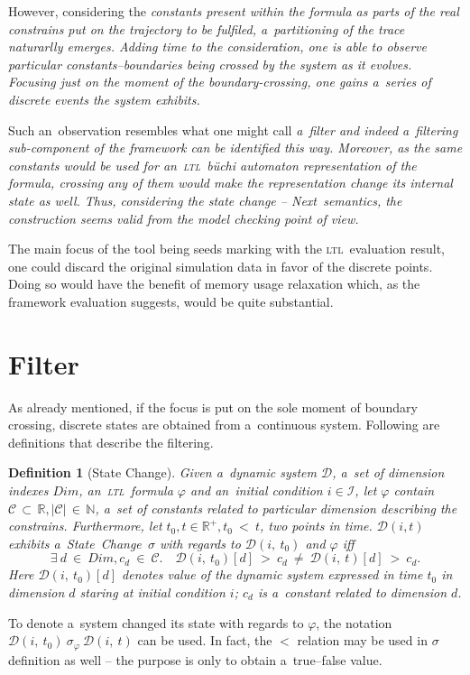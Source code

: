 \documentclass[11pt]{fithesis}
\newcommand{\ltl}{\textsc{ltl}~}
\newcommand{\Next}{\emph{Next}~}
\newcommand{\mD}{\mathcal{D}}
\newcommand{\mC}{\mathcal{C}}
\newcommand{\mI}{\mathcal{I}}
\newcommand{\mReal}{\mathbb{R}}
\newcommand{\mNatural}{\mathbb{N}}
\newtheorem{mydef}{Definition}
\begin{document}
However, considering the \em constants \rm present within the formula as parts of the real \em constrains \rm put on the 
trajectory to be fulfiled, a~partitioning of the trace naturarlly emerges. Adding time to the consideration, one is able to
observe particular constants--boundaries being crossed by the system as it evolves. \em Focusing just on the moment of
the boundary-crossing, one gains a~series of discrete events the system exhibits\rm{}.

Such an~observation resembles what one might call \em a~filter \rm and indeed a~filtering sub-component of the framework
can be identified this way. Moreover, as the same constants would be used for an~\ltl b\"{u}chi automaton representation of the formula, 
crossing any of them would make the representation change its internal state as well.
Thus, considering the state change -- \Next semantics, the construction seems valid from the model checking point of view.

The main focus of the tool being seeds marking with the \ltl evaluation result, one could discard the original simulation
data in favor of the discrete points.
Doing so would have the benefit of memory usage relaxation which, as the framework evaluation suggests, would be quite substantial.

\section{Filter}
As already mentioned, if the focus is put on the sole moment of boundary
crossing, discrete states are obtained from a~continuous system.
Following are definitions that describe the filtering.
\begin{mydef}[State Change]
Given a~dynamic system $\mD$, a~set of dimension indexes $Dim$, an~\ltl formula $\varphi$ and an~initial
condition $i \in \mI$, let $\varphi$ contain
$\mC\,\subset\,\mReal, |\mC|\,\in\,\mNatural$, a~set of constants related to
particular dimension describing the constrains. Furthermore, let
$t_0, t \in \mReal^{+}, t_0~<~t$, two points in time.
$\mD(i, t)$ exhibits a~State~Change~$\sigma$ with regards to $\mD(i,~t_0)$ and
$\varphi$ iff
$$\exists~d~\in~Dim, c_d~\in~\mC.\quad \mD(i,~t_0)[d]~>~c_d~\neq~\mD(i,~t)[d]~>~c_d.$$
Here $\mD(i,~t_0)[d]$ denotes value of the dynamic system expressed in time
$t_0$ in dimension $d$ staring at initial condition $i$; $c_d$
is a~constant related to dimension $d$.
\end{mydef}
To denote a~system changed its state with regards to $\varphi$, the notation
$\mD(i,~t_0)~\sigma_\varphi~\mD(i,~t)$ can be used.
In fact, the $<$ relation may be used in $\sigma$ definition as well --
the purpose is only to obtain a~true--false value.
 
%

%
%
\end{document}
